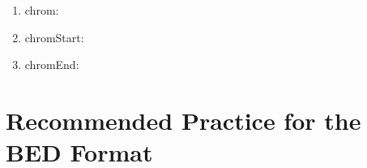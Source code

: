\documentclass[12pt]{article}
\begin{document}
\begin{enumerate}
  \item chrom:
  \item chromStart:
  \item chromEnd:
\end{enumerate}
\section{Recommended Practice for the BED Format}
\end{document}
